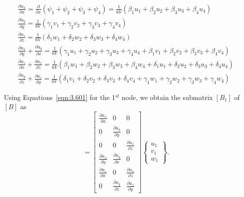\begin{equation}
\begin{array}{l}
\frac{\partial{u_{x}}}{\partial{x}}
=
\frac{\partial{}}{\partial{x}}(\psi_{1} + \psi_{2} + \psi_{3} + \psi_{4})
=
\frac{1}{6V}(\beta_{1}u_{1} + \beta_{2}u_{2} + \beta_{3}u_{3} + \beta_{4}u_{4}) \\
\frac{\partial{u_{y}}}{\partial{y}}
=
\frac{1}{6V}(\gamma_{1}v_{1} + \gamma_{2}v_{2} + \gamma_{3}v_{3} + \gamma_{4}v_{4}) \\
\frac{\partial{u_{z}}}{\partial{z}}
=
\frac{1}{6V}(\delta_{1}w_{1} + \delta_{2}w_{2} + \delta_{3}w_{3} + \delta_{4}w_{4}) \\
\frac{\partial{u_{x}}}{\partial{y}} + \frac{\partial{u_{y}}}{\partial{x}}
=
\frac{1}{6V}(\gamma_{1}u_{1} + \gamma_{2}u_{2} + \gamma_{3}u_{3} + \gamma_{4}u_{4} + \beta_{1}v_{1} + \beta_{2}v_{2} + \beta_{3}v_{3} + \beta_{4}v_{4}) \\
\frac{\partial{u_{z}}}{\partial{x}} + \frac{\partial{u_{x}}}{\partial{z}}
=
\frac{1}{6V}(\beta_{1}w_{1} + \beta_{2}w_{2} + \beta_{3}w_{3} + \beta_{4}w_{4} + \delta_{1}u_{1} + \delta_{2}u_{2} + \delta_{3}u_{3} + \delta_{4}u_{4}) \\
\frac{\partial{u_{y}}}{\partial{z}} + \frac{\partial{u_{z}}}{\partial{y}}
=
\frac{1}{6V}(\delta_{1}v_{1} + \delta_{2}v_{2} + \delta_{3}v_{3} + \delta_{4}v_{4} + \gamma_{1}w_{1} + \gamma_{2}w_{2} + \gamma_{3}w_{3} + \gamma_{4}w_{4})
\end{array}
\label{eqn:3.601}
\end{equation}

\noindent Using Equations~\ref{eqn:3.601} for the 1$^{st}$ node, we obtain the submatrix $[B_1]$ of $[B]$ as
\begin{equation}
[B_{1}]
 =
\begin{bmatrix}
    {\frac{\partial{u_{x}}}{\partial{x}}} & 0 & 0 \\
    0 & \frac{\partial{u_{y}}}{\partial{y}} & 0 \\
    0  & 0  & \frac{\partial{u_{z}}}{\partial{z}}  \\
    \frac{\partial{u_{x}}}{\partial{y}} & \frac{\partial{u_{y}}}{\partial{x}} & 0 \\
    \frac{\partial{u_{z}}}{\partial{x}} & 0 & \frac{\partial{u_{x}}}{\partial{z}} \\
    0 &  \frac{\partial{u_{y}}}{\partial{z}} & \frac{\partial{u_{z}}}{\partial{y}}
 \end{bmatrix}
\begin{Bmatrix}
u_{1} \\
v_{1} \\
w_{1}
\end{Bmatrix}.
 \label{eqn:3.7}
\end{equation}

